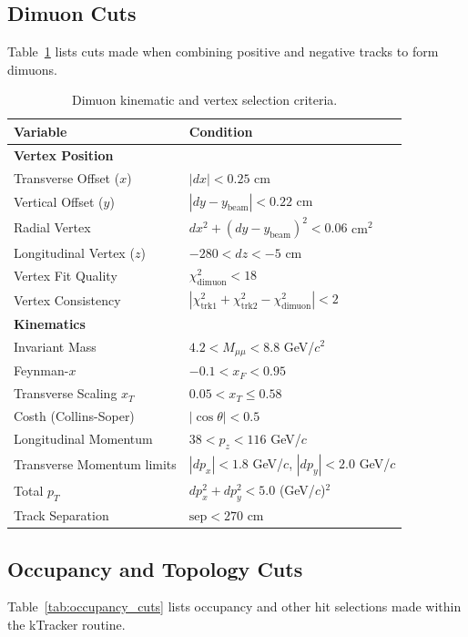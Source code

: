 \documentclass[11pt]{article}
\begin{document}
\subsection{Dimuon Cuts}
Table~\ref{tab:dimuon_cuts} lists cuts made when combining positive and negative tracks to form dimuons.

\begin{table}[!ht]
    \centering
    \caption{Dimuon kinematic and vertex selection criteria.}
    \label{tab:dimuon_cuts}
    \begin{tabular}{@{}ll@{}}
        \toprule
        \textbf{Variable} & \textbf{Condition} \\ 
        \midrule
        \textbf{Vertex Position} & \\
        Transverse Offset ($x$) & $|dx| < 0.25$ cm \\
        Vertical Offset ($y$) & $|dy - y_{\text{beam}}| < 0.22$ cm \\
        Radial Vertex & $dx^2 + (dy - y_{\text{beam}})^2 < 0.06$ cm$^2$ \\
        Longitudinal Vertex ($z$) & $-280 < dz < -5$ cm \\
        Vertex Fit Quality & $\chi^2_{\text{dimuon}} < 18$ \\
        Vertex Consistency & $|\chi^2_{\text{trk1}} + \chi^2_{\text{trk2}} - \chi^2_{\text{dimuon}}| < 2$ \\
        \midrule
        \textbf{Kinematics} & \\
        Invariant Mass & $4.2 < M_{\mu\mu} < 8.8$ GeV/$c^2$ \\
        Feynman-$x$ & $-0.1 < x_F < 0.95$ \\
        Transverse Scaling $x_T$ & $0.05 < x_T \le 0.58$ \\
        Costh (Collins-Soper) & $|\cos \theta| < 0.5$ \\
        Longitudinal Momentum & $38 < p_z < 116$ GeV/$c$ \\
        Transverse Momentum limits & $|dp_x| < 1.8$ GeV/$c$, $|dp_y| < 2.0$ GeV/$c$ \\
        Total $p_T$ & $dp_x^2 + dp_y^2 < 5.0$ (GeV/$c$)$^2$ \\
        Track Separation & $\text{sep} < 270$ cm \\
        \bottomrule
    \end{tabular}
\end{table}

\subsection{Occupancy and Topology Cuts}
Table~\ref{tab:occupancy_cuts} lists occupancy and other hit selections made within the kTracker routine.
\end{document}
